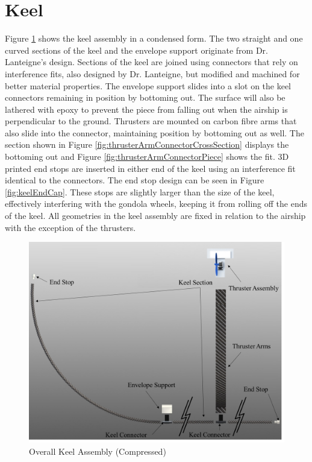 \documentclass[../main.tex]{subfiles}
\begin{document}
\section{Keel}
Figure \ref{fig:keelAssemblyCompressedThruster} shows the keel assembly in a condensed form. The two straight and one curved sections of the keel and the envelope support originate from Dr. Lanteigne's design. Sections of the keel are joined using connectors that rely on interference fits, also designed by Dr. Lanteigne, but modified and machined for better material properties. The envelope support slides into a slot on the keel connectors remaining in position by bottoming out. The surface will also be lathered with epoxy to prevent the piece from falling out when the airship is perpendicular to the ground. Thrusters are mounted on carbon fibre arms that also slide into the connector, maintaining position by bottoming out as well. The section shown in Figure \ref{fig:thrusterArmConnectorCrossSection} displays the bottoming out and Figure \ref{fig:thrusterArmConnectorPiece} shows the fit. 3D printed end stops are inserted in either end of the keel using an interference fit identical to the connectors. The end stop design can be seen in Figure \ref{fig:keelEndCap}. These stops are slightly larger than the size of the keel, effectively interfering with the gondola wheels, keeping it from rolling off the ends of the keel. All geometries in the keel assembly are fixed in relation to the airship with the exception of the thrusters.
\\
\begin{figure}[H]
	\centering
	\includegraphics[width=.8\linewidth]{img/design/keel/keelAssemblyCompressedThruster.png}
	\caption{Overall Keel Assembly (Compressed)}
	\label{fig:keelAssemblyCompressedThruster}
\end{figure}
\end{document}
